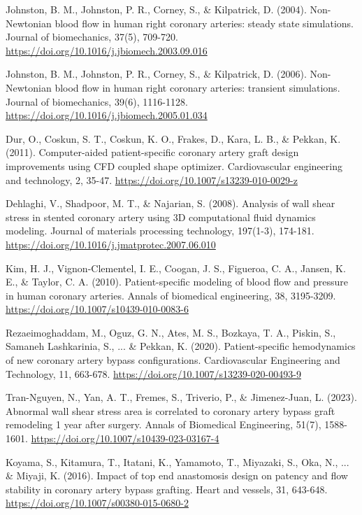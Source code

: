 ﻿\documentclass[12pt,a4paper]{article}
\theoremstyle{definition}
\numberwithin{equation}{section}
\begin{document}
\begin{thebibliography}{}
 Johnston, B. M., Johnston, P. R., Corney, S., \& Kilpatrick, D. (2004). Non-Newtonian blood flow in human right coronary arteries: steady state simulations. Journal of biomechanics, 37(5), 709-720. \url{https://doi.org/10.1016/j.jbiomech.2003.09.016}

 Johnston, B. M., Johnston, P. R., Corney, S., \& Kilpatrick, D. (2006). Non-Newtonian blood flow in human right coronary arteries: transient simulations. Journal of biomechanics, 39(6), 1116-1128. \url{https://doi.org/10.1016/j.jbiomech.2005.01.034}

 Dur, O., Coskun, S. T., Coskun, K. O., Frakes, D., Kara, L. B., \& Pekkan, K. (2011). Computer-aided patient-specific coronary artery graft design improvements using CFD coupled shape optimizer. Cardiovascular engineering and technology, 2, 35-47. \url{https://doi.org/10.1007/s13239-010-0029-z}

 Dehlaghi, V., Shadpoor, M. T., \& Najarian, S. (2008). Analysis of wall shear stress in stented coronary artery using 3D computational fluid dynamics modeling. Journal of materials processing technology, 197(1-3), 174-181. \url{https://doi.org/10.1016/j.jmatprotec.2007.06.010}

 Kim, H. J., Vignon-Clementel, I. E., Coogan, J. S., Figueroa, C. A., Jansen, K. E., \& Taylor, C. A. (2010). Patient-specific modeling of blood flow and pressure in human coronary arteries. Annals of biomedical engineering, 38, 3195-3209. \url{https://doi.org/10.1007/s10439-010-0083-6}

 Rezaeimoghaddam, M., Oguz, G. N., Ates, M. S., Bozkaya, T. A., Piskin, S., Samaneh Lashkarinia, S., ... \& Pekkan, K. (2020). Patient-specific hemodynamics of new coronary artery bypass configurations. Cardiovascular Engineering and Technology, 11, 663-678. \url{https://doi.org/10.1007/s13239-020-00493-9}

 Tran-Nguyen, N., Yan, A. T., Fremes, S., Triverio, P., \& Jimenez-Juan, L. (2023). Abnormal wall shear stress area is correlated to coronary artery bypass graft remodeling 1 year after surgery. Annals of Biomedical Engineering, 51(7), 1588-1601. \url{https://doi.org/10.1007/s10439-023-03167-4}

 Koyama, S., Kitamura, T., Itatani, K., Yamamoto, T., Miyazaki, S., Oka, N., ... \& Miyaji, K. (2016). Impact of top end anastomosis design on patency and flow stability in coronary artery bypass grafting. Heart and vessels, 31, 643-648. \url{https://doi.org/10.1007/s00380-015-0680-2}


\end{thebibliography}
\end{document}
